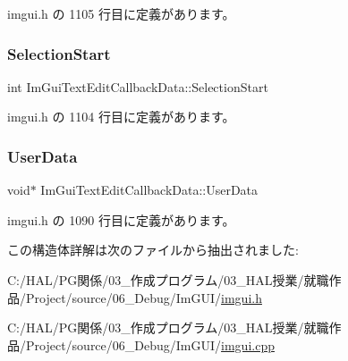  imgui.\+h の 1105 行目に定義があります。

\mbox{\label{struct_im_gui_text_edit_callback_data_a1634bec3717f7e386033051cf604efed}} 
\subsubsection{\texorpdfstring{Selection\+Start}{SelectionStart}}
{\footnotesize\ttfamily int Im\+Gui\+Text\+Edit\+Callback\+Data\+::\+Selection\+Start}



 imgui.\+h の 1104 行目に定義があります。

\mbox{\label{struct_im_gui_text_edit_callback_data_aaf4994a17aefa6ace9cf8f7c2fa06cf7}} 
\subsubsection{\texorpdfstring{User\+Data}{UserData}}
{\footnotesize\ttfamily void$\ast$ Im\+Gui\+Text\+Edit\+Callback\+Data\+::\+User\+Data}



 imgui.\+h の 1090 行目に定義があります。



この構造体詳解は次のファイルから抽出されました\+:\begin{DoxyCompactItemize}
\item 
C\+:/\+H\+A\+L/\+P\+G関係/03\+\_\+作成プログラム/03\+\_\+\+H\+A\+L授業/就職作品/\+Project/source/06\+\_\+\+Debug/\+Im\+G\+U\+I/\mbox{\hyperlink{imgui_8h}{imgui.\+h}}\item 
C\+:/\+H\+A\+L/\+P\+G関係/03\+\_\+作成プログラム/03\+\_\+\+H\+A\+L授業/就職作品/\+Project/source/06\+\_\+\+Debug/\+Im\+G\+U\+I/\mbox{\hyperlink{imgui_8cpp}{imgui.\+cpp}}\end{DoxyCompactItemize}
